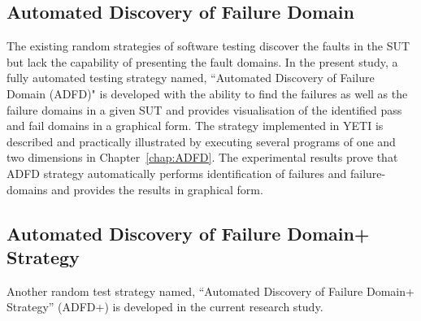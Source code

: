 \subsection{Automated Discovery of Failure Domain}
The existing random strategies of software testing discover the faults in the SUT but lack the capability of presenting the fault domains. In the present study, a fully automated testing strategy named, ``Automated Discovery of Failure Domain (ADFD)" is developed with the ability to find the failures as well as the failure domains in a given SUT and provides visualisation of the identified pass and fail domains in a graphical form. The strategy implemented in YETI is described and practically illustrated by executing several programs of one and two dimensions in Chapter~\ref{chap:ADFD}. The experimental results prove that ADFD strategy automatically performs identification of failures and failure-domains and provides the results in graphical form.

\subsection{Automated Discovery of Failure Domain+ Strategy}
Another random test strategy named, ``Automated Discovery of Failure Domain+ Strategy'' (ADFD+) is developed in the current research study. 


%



